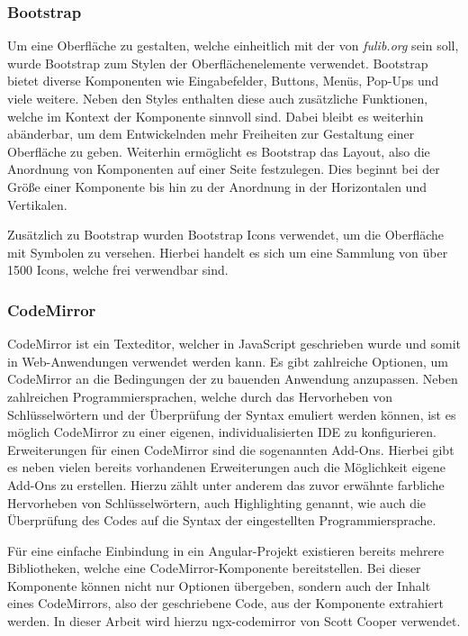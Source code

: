 \subsubsection{Bootstrap}
Um eine Oberfläche zu gestalten, welche einheitlich mit der von \textit{fulib.org} sein soll, wurde Bootstrap zum
Stylen der Oberflächenelemente verwendet.
Bootstrap bietet diverse Komponenten wie Eingabefelder, Buttons, Menüs, Pop-Ups und viele weitere.
Neben den Styles enthalten diese auch zusätzliche Funktionen, welche im Kontext der Komponente sinnvoll sind.
Dabei bleibt es weiterhin abänderbar, um dem Entwickelnden mehr Freiheiten zur Gestaltung einer Oberfläche zu geben.
Weiterhin ermöglicht es Bootstrap das Layout, also die Anordnung von Komponenten auf einer Seite festzulegen.
Dies beginnt bei der Größe einer Komponente bis hin zu der Anordnung in der Horizontalen und Vertikalen\cite*{bs}.

Zusätzlich zu Bootstrap wurden Bootstrap Icons verwendet, um die Oberfläche mit Symbolen zu versehen.
Hierbei handelt es sich um eine Sammlung von über 1500 Icons, welche frei verwendbar sind\cite*{bsIcons}.

\subsubsection{CodeMirror}
CodeMirror ist ein Texteditor, welcher in JavaScript geschrieben wurde und somit in Web-Anwendungen verwendet werden kann.
Es gibt zahlreiche Optionen, um CodeMirror an die Bedingungen der zu bauenden Anwendung anzupassen.
Neben zahlreichen Programmiersprachen, welche durch das Hervorheben von Schlüsselwörtern und der Überprüfung der Syntax emuliert werden können,
ist es möglich CodeMirror zu einer eigenen, individualisierten \ac{IDE} zu konfigurieren.
Erweiterungen für einen CodeMirror sind die sogenannten Add-Ons.
Hierbei gibt es neben vielen bereits vorhandenen Erweiterungen auch die Möglichkeit eigene Add-Ons zu erstellen.
Hierzu zählt unter anderem das zuvor erwähnte farbliche Hervorheben von Schlüsselwörtern, auch Highlighting genannt, wie auch die
Überprüfung des Codes auf die Syntax der eingestellten Programmiersprache\cite*{cm}.

Für eine einfache Einbindung in ein Angular-Projekt existieren bereits mehrere Bibliotheken, welche eine CodeMirror-Komponente bereitstellen.
Bei dieser Komponente können nicht nur Optionen übergeben, sondern auch der Inhalt eines CodeMirrors, also der geschriebene Code, aus der Komponente
extrahiert werden.
In dieser Arbeit wird hierzu ngx-codemirror von Scott Cooper verwendet\cite*{ngxcm}.
